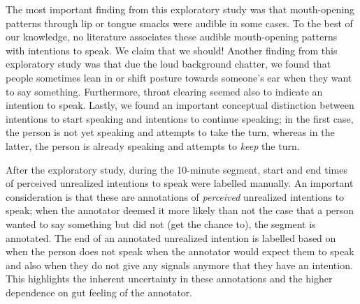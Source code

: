 \documentclass[sigconf]{acmart}
\begin{document}
The most important finding from this exploratory study was that mouth-opening patterns through lip or tongue smacks were audible in some cases. To the best of our knowledge, no literature associates these audible mouth-opening patterns with intentions to speak. We claim that we should! Another finding from this exploratory study was that due the loud background chatter, we found that people sometimes lean in or shift posture towards someone's ear when they want to say something. Furthermore, throat clearing seemed also to indicate an intention to speak. Lastly, we found an important conceptual distinction between intentions to start speaking and intentions to continue speaking; in the first case, the person is not yet speaking and attempts to take the turn, whereas in the latter, the person is already speaking and attempts to \emph{keep} the turn. 


After the exploratory study, during the 10-minute segment, start and end times of perceived unrealized intentions to speak were labelled manually.
An important consideration is that these are annotations of \emph{perceived} unrealized intentions to speak; when the annotator deemed it more likely than not the case that a person wanted to say something but did not (get the chance to), the segment is annotated.  The end of an annotated unrealized intention is labelled based on when the person does not speak when the annotator would expect them to speak and also when they do not give any signals anymore that they have an intention. 
This highlights the inherent uncertainty in these annotations and the higher dependence on gut feeling of the annotator. 
\end{document}
